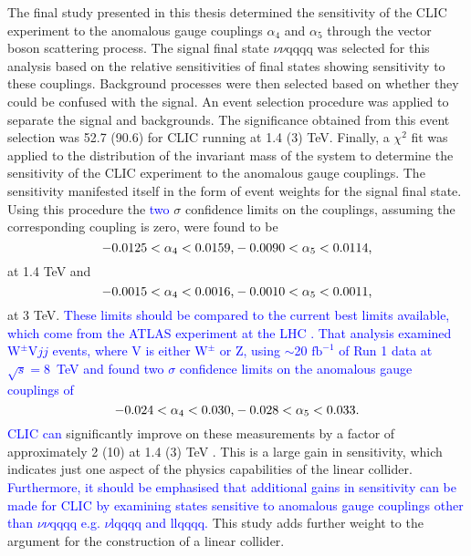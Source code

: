 The final study presented in this thesis determined the sensitivity of the CLIC experiment to the anomalous gauge couplings $\alpha_{4}$ and $\alpha_{5}$ through the vector boson scattering process.  The signal final state $\nu\nu\text{qqqq}$ was selected for this analysis based on the relative sensitivities of final states showing sensitivity to these couplings.  Background processes were then selected based on whether they could be confused with the signal.  An event selection procedure was applied to separate the signal and backgrounds.  The significance obtained from this event selection was 52.7 (90.6) for CLIC running at 1.4 (3) TeV.  Finally, a $\chi^{2}$ fit was applied to the distribution of the invariant mass of the system to determine the sensitivity of the CLIC experiment to the anomalous gauge couplings.  The sensitivity manifested itself in the form of event weights for the signal final state.  Using this procedure the \textcolor{blue}{two} $\sigma$ confidence limits on the couplings, assuming the corresponding coupling is zero, were found to be
%
\begin{equation}
-0.0125 < \alpha_{4} < 0.0159 \text{,} \\
-0.0090 < \alpha_{5} < 0.0114 \text{,}
\end{equation}
%
\noindent at 1.4 TeV and
%
\begin{equation}
-0.0015 < \alpha_{4} < 0.0016 \text{,} \\
-0.0010 < \alpha_{5} < 0.0011 \text{,}
\end{equation}
%
\noindent at 3 TeV.  \textcolor{blue}{These limits should be compared to the current best limits available, which come from the ATLAS experiment at the LHC \cite{Green:2016trm}.  That analysis examined $\text{W}^{\pm}\text{V}jj$ events, where V is either $\text{W}^{\pm}$ or Z, using $\sim$20 $\text{fb}^{-1}$ of Run 1 data at $\sqrt{s} = 8$~TeV and found two $\sigma$ confidence limits on the anomalous gauge couplings of}
%
\begin{equation}
-0.024 < \alpha_{4} < 0.030 \text{,} \\
-0.028 < \alpha_{5} < 0.033 \text{.}
\end{equation}
%
\textcolor{blue}{CLIC can} significantly improve on these measurements by a factor of approximately 2 (10) at 1.4 (3) TeV \cite{Green:2016trm}.  This is a large gain in sensitivity, which indicates just one aspect of the physics capabilities of the linear collider.  \textcolor{blue}{Furthermore, it should be emphasised that additional gains in sensitivity can be made for CLIC by examining states sensitive to anomalous gauge couplings other than $\nu\nu\text{qqqq}$ e.g. $\nu\text{lqqqq}$ and llqqqq.}  This study adds further weight to the argument for the construction of a linear collider.   

